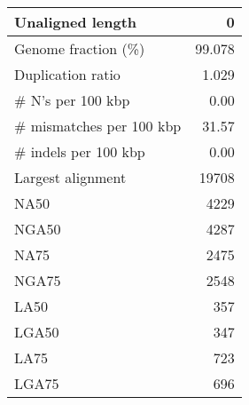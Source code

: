 \documentclass[12pt,a4paper]{article}
\begin{document}
\begin{table}[ht]
\begin{center}
\begin{tabular}{|l*{1}{|r}|}
Unaligned length & 0 \\ \hline
Genome fraction (\%) & 99.078 \\ \hline
Duplication ratio & 1.029 \\ \hline
\# N's per 100 kbp & 0.00 \\ \hline
\# mismatches per 100 kbp & 31.57 \\ \hline
\# indels per 100 kbp & 0.00 \\ \hline
Largest alignment & 19708 \\ \hline
NA50 & 4229 \\ \hline
NGA50 & 4287 \\ \hline
NA75 & 2475 \\ \hline
NGA75 & 2548 \\ \hline
LA50 & 357 \\ \hline
LGA50 & 347 \\ \hline
LA75 & 723 \\ \hline
LGA75 & 696 \\ \hline
\end{tabular}
\end{center}
\end{table}
\end{document}
